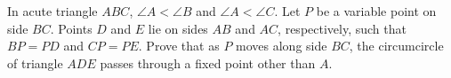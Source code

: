 In acute triangle $ABC$, $\angle{A}<\angle{B}$ and $\angle{A}<\angle{C}$. Let $P$ be a variable point on side $BC$. Points $D$ and $E$ lie on sides $AB$ and $AC$, respectively, such that $BP=PD$ and $CP=PE$. Prove that as $P$ moves along side $BC$, the circumcircle of triangle $ADE$ passes through a fixed point other than $A$.
